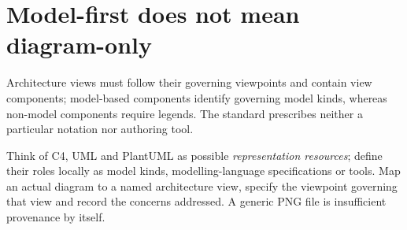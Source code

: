 \documentclass[11pt,letterpaper]{article}
\begin{document}
\InterpretationKey
\section{Model-first does not mean diagram-only}
\begin{Requirement}\FlagReq{} Architecture views must follow their governing viewpoints and contain view components; model-based components identify governing model kinds, whereas non-model components require legends. The standard prescribes neither a particular notation nor authoring tool. \end{Requirement}
\begin{Guidance}Think of C4, UML and PlantUML as possible \emph{representation resources}; define their roles locally as model kinds, modelling-language specifications or tools. Map an actual diagram to a named architecture view, specify the viewpoint governing that view and record the concerns addressed. A generic PNG file is insufficient provenance by itself.\end{Guidance}
\end{document}
